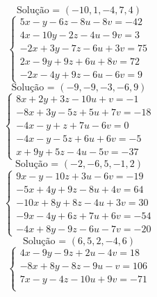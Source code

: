 \documentclass[12pt,oneside,a4paper,fleqn]{article}
\begin{document}
\begin{multicols*}{2}
\begin{equation*}
\text{Solução = }\left(-10,1,-4,7,4\right)
\end{equation*}
\vspace{\baselineskip}
\begin{equation*}
\begin{cases}
5x-y-6z-8u-8v=-42 \\
4x-10y-2z-4u-9v=3 \\
-2x+3y-7z-6u+3v=75 \\
2x-9y+9z+6u+8v=72 \\
-2x-4y+9z-6u-6v=9
\end{cases}
\end{equation*}
\begin{equation*}
\text{Solução = }\left(-9,-9,-3,-6,9\right)
\end{equation*}
\vspace{\baselineskip}
\begin{equation*}
\begin{cases}
8x+2y+3z-10u+v=-1 \\
-8x+3y-5z+5u+7v=-18 \\
-4x-y+z+7u-6v=0 \\
-4x-y-5z+6u+6v=-5 \\
x+9y+5z-4u-5v=-37
\end{cases}
\end{equation*}
\begin{equation*}
\text{Solução = }\left(-2,-6,5,-1,2\right)
\end{equation*}
\vspace{\baselineskip}
\begin{equation*}
\begin{cases}
9x-y-10z+3u-6v=-19 \\
-5x+4y+9z-8u+4v=64 \\
-10x+8y+8z-4u+3v=30 \\
-9x-4y+6z+7u+6v=-54 \\
-4x+8y-9z-6u-7v=-20
\end{cases}
\end{equation*}
\begin{equation*}
\text{Solução = }\left(6,5,2,-4,6\right)
\end{equation*}
\vspace{\baselineskip}
\begin{equation*}
\begin{cases}
4x-9y-9z+2u-4v=18 \\
-8x+8y-8z-9u-v=106 \\
7x-y-4z-10u+9v=-71 \\

\end{cases}
\end{equation*}
\end{multicols*}
\end{document}
